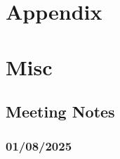 \documentclass{article}
\begin{document}




\section*{Appendix}

\section{Misc}

\subsection{Meeting Notes}

\subsubsection{01/08/2025}    
\end{document}
